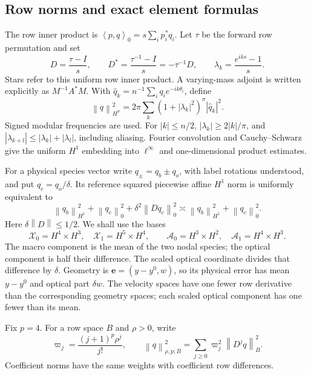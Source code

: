 \documentclass[11pt,a4paper]{article}
\numberwithin{equation}{section}
\theoremstyle{remark}
\newcommand{\norm}[1]{\left\lVert #1\right\rVert}
\newcommand{\ip}[2]{\left\langle #1,#2\right\rangle_0}
\newcommand{\Xzero}{\mathcal X_0}
\newcommand{\Xone}{\mathcal X_1}
\newcommand{\Azero}{\mathcal A_0}
\newcommand{\Aone}{\mathcal A_1}
\begin{document}
\subsection{Row norms and exact element formulas}

The row inner product is \(\ip pq=s\sum_i p_i^*q_i\).
Let \(\tau\) be the forward row permutation and set
\[
 D=\frac{\tau-I}{s},\qquad
 D^*=\frac{\tau^{-1}-I}{s}=-\tau^{-1}D,\qquad
 \lambda_k=\frac{e^{iks}-1}{s}.
\]
Stars refer to this uniform row inner product. A varying-mass adjoint
is written explicitly as \(M^{-1}A^*M\).
With \(\widehat q_k=n^{-1}\sum_iq_i e^{-ik\theta_i}\), define
\begin{equation}\label{eq:row-sobolev}
 \norm q_{H^\sigma}^2
   =2\pi\sum_k(1+|\lambda_k|^2)^\sigma|\widehat q_k|^2 .
\end{equation}
Signed modular frequencies are used. For \(|k|\leq n/2\),
\(|\lambda_k|\geq 2|k|/\pi\), and
\(|\lambda_{k+l}|\leq|\lambda_k|+|\lambda_l|\), including aliasing.
Fourier convolution and Cauchy--Schwarz give the uniform \(H^1\)
embedding into \(\ell^\infty\) and one-dimensional product estimates.

For a physical species vector write \(q_\pm=q_b\pm q_o\), with
label rotations understood, and put \(q_c=q_o/\delta\). Its reference
squared piecewise affine \(H^1\) norm is uniformly equivalent to
\[
 \norm{q_b}_{H^1}^2+\norm{q_c}_0^2+
                      \delta^2\norm{Dq_c}_0^2
 \asymp\norm{q_b}_{H^1}^2+\norm{q_c}_0^2 .
\]
Here \(\delta\norm D\leq1/2\). We shall use the bases
\begin{equation}\label{eq:bases}
 \Xzero=H^4\times H^3,\quad \Xone=H^5\times H^4,\qquad
 \Azero=H^3\times H^2,\quad \Aone=H^4\times H^3 .
\end{equation}
The macro component is the mean of the two nodal species; the optical
component is half their difference. The scaled optical coordinate divides
that difference by \(\delta\). Geometry is \(\mathbf e=(y-y^0,w)\),
so its physical error has mean \(y-y^0\) and optical part \(\delta w\).
The velocity spaces have one fewer row derivative than the corresponding
geometry spaces; each scaled optical component has one fewer than its mean.

Fix \(p=4\). For a row space \(B\) and \(\rho>0\), write
\begin{equation}\label{eq:analytic-norm}
 \varpi_j=\frac{(j+1)^p\rho^j}{j!},\qquad
 \norm q_{\rho,p;B}^2=\sum_{j\geq0}\varpi_j^2\norm{D^jq}_B^2 .
\end{equation}
Coefficient norms have the same weights with coefficient row
differences.
\end{document}
